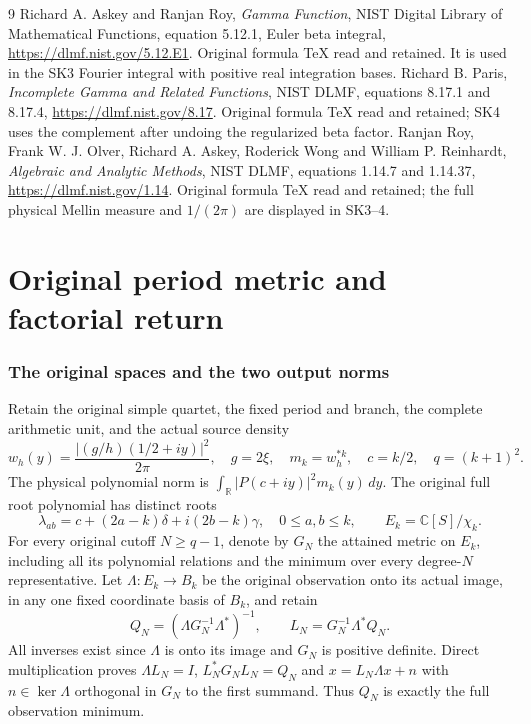 \begin{thebibliography}{9}
 Richard A. Askey and Ranjan Roy,
\emph{Gamma Function}, NIST Digital Library of Mathematical Functions,
equation 5.12.1, Euler beta integral, \url{https://dlmf.nist.gov/5.12.E1}.
Original formula TeX read and retained. It is used in the SK3 Fourier
integral with positive real integration bases.
 Richard B. Paris, \emph{Incomplete Gamma and Related
Functions}, NIST DLMF, equations 8.17.1 and 8.17.4,
\url{https://dlmf.nist.gov/8.17}. Original formula TeX read and retained;
SK4 uses the complement after undoing the regularized beta factor.
 Ranjan Roy, Frank W. J. Olver, Richard A. Askey,
Roderick Wong and William P. Reinhardt, \emph{Algebraic and Analytic
Methods}, NIST DLMF, equations 1.14.7 and 1.14.37,
\url{https://dlmf.nist.gov/1.14}. Original formula TeX read and retained;
the full physical Mellin measure and $1/(2\pi)$ are displayed in SK3--4.
\end{thebibliography}


\endgroup

\clearpage\begingroup
\part*{Original period metric and factorial return}
\newcommand{\pperiodC}{\mathbb C}
\newcommand{\pperiodR}{\mathbb R}
\newcommand{\pperiodim}{\operatorname{im}}
\newcommand{\pperioddiag}{\operatorname{diag}}



\section{The original spaces and the two output norms}
Retain the original simple quartet, the fixed period and branch, the
complete arithmetic unit, and the actual source density
\[
 w_h(y)=\frac{|(g/h)(1/2+iy)|^2}{2\pi},\quad g=2\xi,
 \quad m_k=w_h^{*k},\quad c=k/2,\quad q=(k+1)^2.                  \tag{PM1}
\]
The physical polynomial norm is
$\int_\pperiodR|P(c+iy)|^2m_k(y)\,dy$.  The original full root polynomial
has distinct roots
\[
 \lambda_{ab}=c+(2a-k)\delta+i(2b-k)\gamma,
 \quad0\le a,b\le k,
 \qquad E_k=\pperiodC[S]/\chi_k.                                      \tag{PM2}
\]
For every original cutoff $N\ge q-1$, denote by $G_N$ the attained
metric on $E_k$, including all its polynomial relations and the
minimum over every degree-$N$ representative.  Let
$\Lambda:E_k\to B_k$ be the original observation onto its actual
image, in any one fixed coordinate basis of $B_k$, and retain
\[
 Q_N=(\Lambda G_N^{-1}\Lambda^*)^{-1},\qquad
 L_N=G_N^{-1}\Lambda^*Q_N.                                     \tag{PM3}
\]
All inverses exist since $\Lambda$ is onto its image and $G_N$
is positive definite.  Direct multiplication proves
$\Lambda L_N=I$, $L_N^*G_NL_N=Q_N$ and
$x=L_N\Lambda x+n$ with $n\in\ker\Lambda$ orthogonal in $G_N$
to the first summand.  Thus $Q_N$ is exactly the full observation
minimum.

